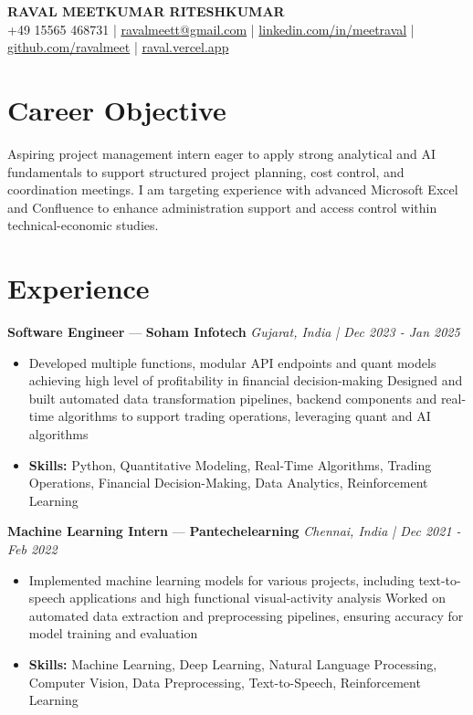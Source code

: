 \documentclass[a4paper,10pt]{article}
\begin{document}
\begin{center}
  {\Large\bfseries RAVAL MEETKUMAR RITESHKUMAR}\\[2pt]
  {\small +49 15565 468731 \;|\; \href{mailto:ravalmeett@gmail.com}{ravalmeett@gmail.com} \;|\; \href{https://www.linkedin.com/in/meetraval/}{linkedin.com/in/meetraval} \;|\; \href{https://github.com/ravalmeet}{github.com/ravalmeet} \;|\; \href{https://raval.vercel.app/}{raval.vercel.app}}
\end{center}
\vspace{-3pt}

\section*{Career Objective}
Aspiring project management intern eager to apply strong analytical and AI fundamentals to support structured project planning, cost control, and coordination meetings. I am targeting experience with advanced Microsoft Excel and Confluence to enhance administration support and access control within technical-economic studies.\par

\section*{Experience}
\textbf{Software Engineer} — \textbf{Soham Infotech} \hfill \textit{Gujarat, India \;|\; Dec 2023 - Jan 2025}\par
\vspace{1pt}
\begin{itemize}
  \item Developed multiple functions, modular API endpoints and quant models achieving high level of profitability in financial decision-making Designed and built automated data transformation pipelines, backend components and real-time algorithms to support trading operations, leveraging quant and AI algorithms
  \item \textbf{Skills:} Python, Quantitative Modeling, Real-Time Algorithms, Trading Operations, Financial Decision-Making, Data Analytics, Reinforcement Learning
\end{itemize}
\vspace{3pt}
\textbf{Machine Learning Intern} — \textbf{Pantechelearning} \hfill \textit{Chennai, India \;|\; Dec 2021 - Feb 2022}\par
\vspace{1pt}
\begin{itemize}
  \item Implemented machine learning models for various projects, including text-to-speech applications and high functional visual-activity analysis Worked on automated data extraction and preprocessing pipelines, ensuring accuracy for model training and evaluation
  \item \textbf{Skills:} Machine Learning, Deep Learning, Natural Language Processing, Computer Vision, Data Preprocessing, Text-to-Speech, Reinforcement Learning
\end{itemize}
\end{document}
